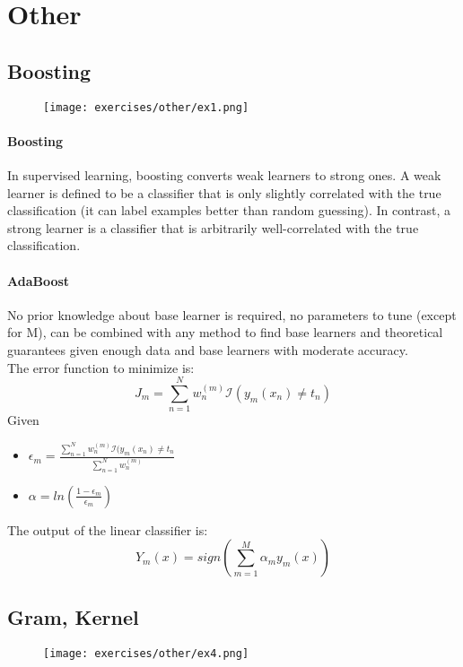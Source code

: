 \section{Other}


\subsection{Boosting}

\begin{figure}[H]
    \centering
    \texttt{[image: exercises/other/ex1.png]}
\end{figure}

\paragraph{Boosting}
In supervised learning, boosting converts weak learners to strong ones. A weak learner is defined to be a classifier that is only slightly correlated with the true classification (it can label examples better than random guessing). In contrast, a strong learner is a classifier that is arbitrarily well-correlated with the true classification.

\paragraph{AdaBoost}
No prior knowledge about base learner is required, no parameters to tune (except for M), can be combined with any method to find base learners and theoretical guarantees given enough data and base learners with moderate accuracy.\\
The error function to minimize is:
\[J_m=\sum_{n=1}^N w_n^{(m)}\mathcal{I}(y_m(x_n)\neq t_n)\]
Given 
\begin{itemize}
\item $\epsilon_m = \frac{\sum_{n=1}^N w_n^{(m)}\mathcal{I}(y_m(x_n)\neq t_n}{\sum_{n=1}^N w_n^{(m)}}$
\item $\alpha=ln(\frac{1-\epsilon_m}{\epsilon_m})$
\end{itemize}
The output of the linear classifier is:
\[Y_m(x)=sign(\sum_{m=1}^M\alpha_my_m(x))\]



\subsection{Gram, Kernel}

\begin{figure}[H]
    \centering
    \texttt{[image: exercises/other/ex4.png]}
\end{figure}
